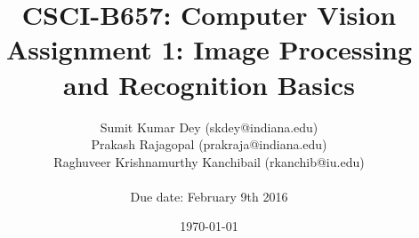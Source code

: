 \documentclass{article}
\begin{document}
\title{CSCI-B657: Computer Vision \\Assignment 1: Image Processing and Recognition Basics}         %
	\author{Sumit Kumar Dey (skdey@indiana.edu) \\ Prakash Rajagopal (prakraja@indiana.edu) \\Raghuveer Krishnamurthy Kanchibail (rkanchib@iu.edu)\\ \\Due date: February 9th 2016}        %
	\date{\today}          %
	\maketitle
	
	\makeatother
	
\end{document}
